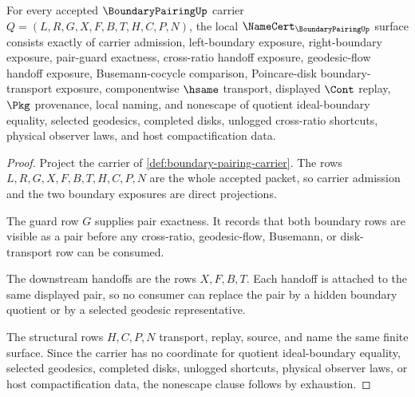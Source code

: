 \begin{theorem}
\label{thm:boundary-pairing-namecert-obligations}
For every accepted $\BoundaryPairingUp$ carrier $Q=(L,R,G,X,F,B,T,H,C,P,N)$, the local $\NameCert_{\BoundaryPairingUp}$ surface consists exactly of carrier admission, left-boundary exposure, right-boundary exposure, pair-guard exactness, cross-ratio handoff exposure, geodesic-flow handoff exposure, Busemann-cocycle comparison, Poincare-disk boundary-transport exposure, componentwise $\hsame$ transport, displayed $\Cont$ replay, $\Pkg$ provenance, local naming, and nonescape of quotient ideal-boundary equality, selected geodesics, completed disks, unlogged cross-ratio shortcuts, physical observer laws, and host compactification data.
\end{theorem}
\begin{proof}
Project the carrier of \autoref{def:boundary-pairing-carrier}. The rows $L,R,G,X,F,B,T,H,C,P,N$ are the whole accepted packet, so carrier admission and the two boundary exposures are direct projections.

The guard row $G$ supplies pair exactness. It records that both boundary rows are visible as a pair before any cross-ratio, geodesic-flow, Busemann, or disk-transport row can be consumed.

The downstream handoffs are the rows $X,F,B,T$. Each handoff is attached to the same displayed pair, so no consumer can replace the pair by a hidden boundary quotient or by a selected geodesic representative.

The structural rows $H,C,P,N$ transport, replay, source, and name the same finite surface. Since the carrier has no coordinate for quotient ideal-boundary equality, selected geodesics, completed disks, unlogged shortcuts, physical observer laws, or host compactification data, the nonescape clause follows by exhaustion.
\end{proof}

